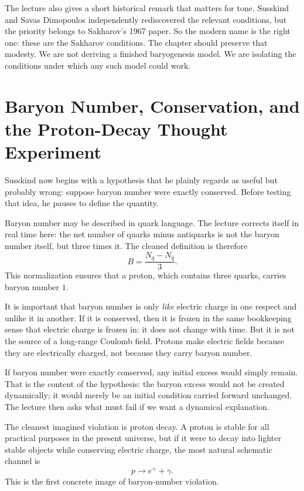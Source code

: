 The lecture also gives a short historical remark that matters for tone. Susskind and Savas Dimopoulos independently rediscovered the relevant conditions, but the priority belongs to Sakharov's 1967 paper. So the modern name is the right one: these are the Sakharov conditions. The chapter should preserve that modesty. We are not deriving a finished baryogenesis model. We are isolating the conditions under which any such model could work.

\section{Baryon Number, Conservation, and the Proton-Decay Thought Experiment}

Susskind now begins with a hypothesis that he plainly regards as useful but probably wrong: suppose baryon number were exactly conserved. Before testing that idea, he pauses to define the quantity.

Baryon number may be described in quark language. The lecture corrects itself in real time here: the net number of quarks minus antiquarks is not the baryon number itself, but three times it. The cleaned definition is therefore
\begin{equation}
B=\frac{N_q-N_{\bar q}}{3}.
\end{equation}
This normalization ensures that a proton, which contains three quarks, carries baryon number \(1\).

It is important that baryon number is only \emph{like} electric charge in one respect and unlike it in another. If it is conserved, then it is frozen in the same bookkeeping sense that electric charge is frozen in: it does not change with time. But it is not the source of a long-range Coulomb field. Protons make electric fields because they are electrically charged, not because they carry baryon number.

If baryon number were exactly conserved, any initial excess would simply remain. That is the content of the hypothesis: the baryon excess would not be created dynamically; it would merely be an initial condition carried forward unchanged. The lecture then asks what must fail if we want a dynamical explanation.

The cleanest imagined violation is proton decay. A proton is stable for all practical purposes in the present universe, but if it were to decay into lighter stable objects while conserving electric charge, the most natural schematic channel is
\begin{equation}
p \to e^+ + \gamma.
\end{equation}
This is the first concrete image of baryon-number violation.

